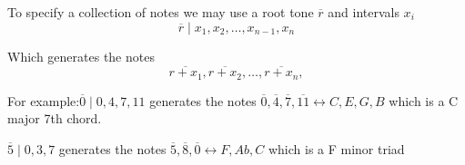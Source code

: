 \documentclass[preview]{standalone}
\begin{document}
\begin{center}
To specify a collection of notes we may use a root tone $\overline{r}$ and intervals $x_i$
  \[
	  \overline{r} \mid x_{1} , x_{2} , \dotsc  , x_{n - 1} , x_{n}
  \]

  Which generates the notes
	  \[
	  \overline{r  +  x_{1}}, \overline{r  +  x_{2}}, \ldots, \overline{r  +  x_{n}}, 
	  \]
  
  For example:$ \overline{0} \mid 0, 4, 7, 11$ generates the notes $ \overline{0}, \overline{4}, \overline{7}, \overline{11} \leftrightarrow C, E, G, B$ which is a C major 7th chord.

	$ \overline{5} \mid 0, 3, 7$ generates the notes $ \overline{5}, \overline{8}, \overline{0} \leftrightarrow F, Ab, C$ which is a F minor triad
\end{center}
\end{document}
